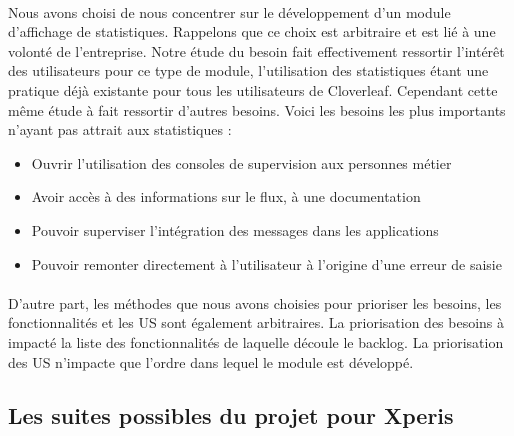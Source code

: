 			\paragraph{}%
			Nous avons choisi de nous concentrer sur le développement d'un module
			d'affichage de statistiques. Rappelons que ce choix est arbitraire et est lié
			à une volonté de l'entreprise. Notre étude du besoin fait effectivement
			ressortir l'intérêt des utilisateurs pour ce type de module, l'utilisation
			des statistiques étant une pratique déjà existante pour tous les utilisateurs
			de Cloverleaf. Cependant cette même étude à fait ressortir d'autres besoins.
			Voici les besoins les plus importants n'ayant pas attrait aux statistiques :
			\begin{itemize}
			  \item Ouvrir l'utilisation des consoles de supervision aux personnes métier
			  \item Avoir accès à des informations sur le flux, à une documentation
			  \item Pouvoir superviser l'intégration des messages dans les applications
			  \item Pouvoir remonter directement à l'utilisateur à l'origine d'une erreur
			  de saisie
			\end{itemize}
			
			\paragraph{}%
			D'autre part, les méthodes que nous avons choisies pour prioriser les
			besoins, les fonctionnalités et les US sont également arbitraires. La
			priorisation des besoins à impacté la liste des fonctionnalités de laquelle
			découle le backlog. La priorisation des US n'impacte que l'ordre
			dans lequel le module est développé.
			
		\subsection{Les suites possibles du projet pour Xperis}

